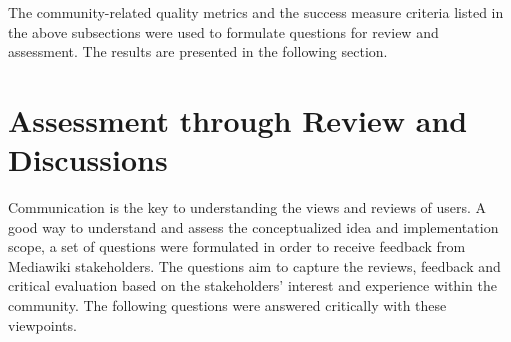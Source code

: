 The community-related quality metrics and the success measure criteria listed in the above subsections were used to formulate questions for review and assessment. The results are presented in the following section.
\section{Assessment through Review and Discussions}
\indent Communication is the key to understanding the views and reviews of users. A good way to understand and assess the conceptualized idea and implementation scope, a set of questions were formulated in order to receive feedback from Mediawiki stakeholders. The questions aim to capture the reviews, feedback and critical evaluation based on the stakeholders' interest and experience within the community. The following questions were answered critically with these viewpoints.
